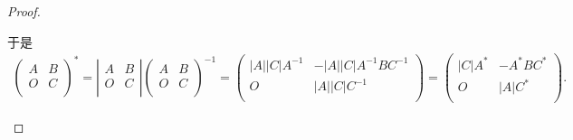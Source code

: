 \documentclass[../../main.tex]{subfiles}
\begin{document}
\begin{proof}
\begin{enumerate}
于是
\begin{align*}
\left( \begin{matrix}
A&		B\\
O&		C\\
\end{matrix} \right) ^*=\left| \begin{matrix}
A&		B\\
O&		C\\
\end{matrix} \right|\left( \begin{matrix}
A&		B\\
O&		C\\
\end{matrix} \right) ^{-1}=\left( \begin{matrix}
\left| A \right|\left| C \right|A^{-1}&		-\left| A \right|\left| C \right|A^{-1}BC^{-1}\\
O&		\left| A \right|\left| C \right|C^{-1}\\
\end{matrix} \right) =\left( \begin{matrix}
\left| C \right|A^*&		-A^*BC^*\\
O&		\left| A \right|C^*\\
\end{matrix} \right) .
\end{align*}


\end{enumerate}
\end{proof}
\end{document}
